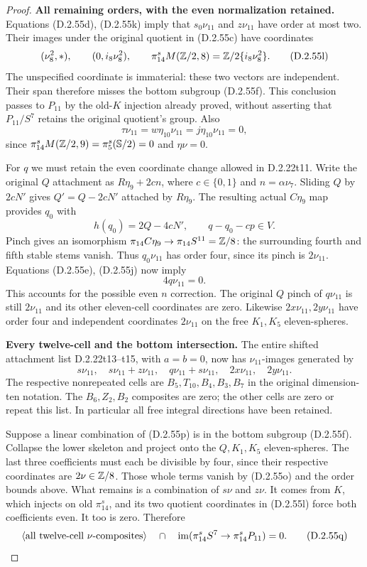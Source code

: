 \begin{proof}
\textbf{All remaining orders, with the even normalization retained.}
Equations \textup{(D.2.55d), (D.2.55k)} imply that
$s_0\nu_{11}$ and $z\nu_{11}$ have order at most two.
Their images under the original quotient in
\textup{(D.2.55c)} have coordinates
\[
  (\nu_8^2,*),\qquad(0,i_8\nu_8^2),
  \qquad
  \pi_{14}^sM(\mathbb Z/2,8)=\mathbb Z/2\{i_8\nu_8^2\}.
  \tag{D.2.55l}
\]
The unspecified coordinate is immaterial: these two
vectors are independent.  Their span therefore misses
the bottom subgroup \textup{(D.2.55f)}.  This conclusion
passes to $P_{11}$ by the old-$K$ injection already
proved, without asserting that $P_{11}/S^7$ retains
the original quotient's group.
Also
\[
 \tau\nu_{11}=w\eta_{10}\nu_{11}
              =j\eta_{10}\nu_{11}=0,
 \tag{D.2.55m}
\]
since $\pi_{14}^sM(\mathbb Z/2,9)=\pi_5^s(\mathbb S/2)=0$
and $\eta\nu=0$.

For $q$ we must retain the even coordinate change
allowed in D.2.22t11.  Write the original $Q$ attachment
as $R\eta_9+2c n$, where $c\in\{0,1\}$ and
$n=\alpha\nu_7$.  Sliding $Q$ by $2cN'$ gives
$Q'=Q-2cN'$ attached by $R\eta_9$.  The resulting
actual $C\eta_9$ map provides $q_0$ with
\[
                  h(q_0)=2Q-4cN',
       \qquad q-q_0-cp\in V.
       \tag{D.2.55n}
\]
Pinch gives an isomorphism
$\pi_{14}C\eta_9\to\pi_{14}S^{11}=\mathbb Z/8$:
the surrounding fourth and fifth stable stems vanish.
Thus $q_0\nu_{11}$ has order four, since its pinch is
$2\nu_{11}$.  Equations \textup{(D.2.55e), (D.2.55j)}
now imply
\[
                            4q\nu_{11}=0.
                            \tag{D.2.55o}
\]
This accounts for the possible even $n$ correction.
The original $Q$ pinch of $q\nu_{11}$ is still
$2\nu_{11}$ and its other eleven-cell coordinates
are zero.  Likewise $2x\nu_{11},2y\nu_{11}$ have
order four and independent coordinates $2\nu_{11}$
on the free $K_1,K_5$ eleven-spheres.

\textbf{Every twelve-cell and the bottom intersection.}
The entire shifted attachment list D.2.22t13--t15,
with $a=b=0$, now has $\nu_{11}$-images generated by
\[
 s\nu_{11},\quad s\nu_{11}+z\nu_{11},\quad
 q\nu_{11}+s\nu_{11},\quad
 2x\nu_{11},\quad2y\nu_{11}.
 \tag{D.2.55p}
\]
The respective nonrepeated cells are $B_5,T_{10},B_4,
B_3,B_7$ in the original dimension-ten notation.
The $B_6,Z_2,B_2$ composites are zero; the other cells
are zero or repeat this list.  In particular all free
integral directions have been retained.

Suppose a linear combination of
\textup{(D.2.55p)} is in the bottom subgroup
\textup{(D.2.55f)}.  Collapse the lower skeleton and
project onto the $Q,K_1,K_5$ eleven-spheres.
The last three coefficients must each be divisible
by four, since their respective coordinates are
$2\nu\in\mathbb Z/8$.
Those whole terms vanish by
\textup{(D.2.55o)} and the order bounds above.
What remains is a combination of $s\nu$ and $z\nu$.
It comes from $K$, which injects on old $\pi_{14}^s$,
and its two quotient coordinates in
\textup{(D.2.55l)} force both coefficients even.
It too is zero.  Therefore
\[
 \langle\hbox{all twelve-cell }\nu\hbox{-composites}\rangle
   \quad\cap\quad
 \operatorname{im}(\pi_{14}^sS^7\to\pi_{14}^sP_{11})=0.
 \tag{D.2.55q}
\]


\end{proof}
